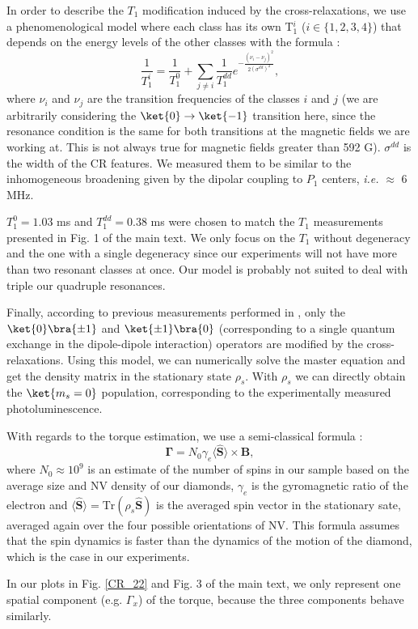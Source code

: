 \documentclass[preprintnumbers,amsmath,amssymb,onecolumn,12pt]{revtex4}
\begin{document}
In order to describe the $T_1$ modification induced by the cross-relaxations, we use a phenomenological model where each class has its own T$_1^i$ ($i \in \{1,2,3,4\}$) that depends on the energy levels of the other classes with the formula :
\begin{equation*}
\frac{1}{T_1^i}=\frac{1}{T_1^0}+\sum_{j \neq i} \frac{1}{T_1^{dd}}e^{-\frac{(\nu_i-\nu_j)^2}{2(\sigma^{dd})^2}},
\end{equation*}
where $\nu_i$ and $\nu_j$ are the transition frequencies of the classes $i$ and $j$ (we are arbitrarily considering the $\ket{0} \to \ket{-1}$ transition here, since the resonance condition is the same for both transitions at the magnetic fields we are working at. This is not always true for magnetic fields greater than 592 G\citep{van_oort_cross-relaxation_1989}). 
$\sigma^{dd} $ is the width of the CR features. We measured them to be similar to the inhomogeneous broadening given by the dipolar coupling to $P_1$ centers, {\it i.e.} $\approx$ 6 MHz.  

$T_1^0=1.03$ ms and $T_1^{dd}=0.38$ ms were chosen to match the $T_1$ measurements presented in Fig. 1 of the main text. We only focus on the $T_1$ without degeneracy and the one with a single degeneracy since our experiments will not have more than two resonant classes at once. Our model is probably not suited to deal with triple our quadruple resonances.

Finally, according to previous measurements performed in \citep{choi_depolarization_2017}, only the $\ket{0}\bra{\pm1}$ and $\ket{\pm1}\bra{0}$ (corresponding to a single quantum exchange in the dipole-dipole interaction) operators are modified by the cross-relaxations. Using this model, we can numerically solve the master equation and get the density matrix in the stationary state $\rho_s$. With $\rho_s$ we can directly obtain the $\ket{m_s=0}$ population, corresponding to the experimentally measured photoluminescence.

With regards to the torque estimation, we use a semi-classical formula :
\begin{equation*}
\mathbf \Gamma = N_0 \gamma_e \langle\hat{\mathbf S}\rangle \times \mathbf B,
\end{equation*}
where $N_0 \approx 10^9$ is an estimate of the number of spins in our sample based on the average size and NV density of our diamonds, $\gamma_e$ is the gyromagnetic ratio of the electron and $\langle\hat{\mathbf S}\rangle =\mathrm{Tr}(\rho_s \mathbf{\hat S})$ is the averaged spin vector in the stationary sate, averaged again over the four possible orientations of NV.
This formula assumes that the spin dynamics is faster than the dynamics of the motion of the diamond, which is the case in our experiments.

In our plots in Fig. \ref{CR_22} and Fig. 3 of the main text, we only represent one spatial component (e.g. $\Gamma_x$) of the torque, because the three components behave similarly.

\end{document}
